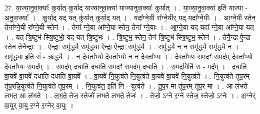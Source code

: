 \documentclass[17pt]{extarticle}
\begin{document}
27. या॒ज्या॒नु॒वा॒क्याः᳚ कुर्यात् कुर्याद् याज्यानुवा॒क्या॑ याज्यानुवा॒क्याः᳚ कुर्यात् । . या॒ज्या॒नु॒वा॒क्या॑ इति॑ याज्या - अ॒नु॒वा॒क्याः᳚ । . कु॒र्या॒द् यद् यत् कु॑र्यात् कुर्या॒द् यत् । . यदा᳚ग्ने॒यी रा᳚ग्ने॒यीर् यद् यदा᳚ग्ने॒यीः । . आ॒ग्ने॒यी स्तेन॒ तेना᳚ग्ने॒यी रा᳚ग्ने॒यी स्तेन॑ । . तेना᳚ ग्ने॒या आ᳚ग्ने॒या स्तेन॒ तेना᳚ ग्ने॒याः । . आ॒ग्ने॒या यद् यदा᳚ ग्ने॒या आ᳚ग्ने॒या यत् । . यत् त्रि॒ष्टुभ॑ स्त्रि॒ष्टुभो॒ यद् यत् त्रि॒ष्टुभः॑ । . त्रि॒ष्टुभ॒ स्तेन॒ तेन॑ त्रि॒ष्टुभ॑ स्त्रि॒ष्टुभ॒ स्तेन॑ । . तेनै॒न्द्रा ऐ॒न्द्रा स्तेन॒ तेनै॒न्द्राः । . ऐ॒न्द्राः समृ॑द्ध्यै॒ समृ॑द्ध्या ऐ॒न्द्रा ऐ॒न्द्राः समृ॑द्ध्यै । . समृ॑द्ध्यै॒ न न समृ॑द्ध्यै॒ समृ॑द्ध्यै॒ न । . समृ॑द्ध्या॒ इति॒ सं - ऋ॒द्ध्यै॒ । . न दे॒वता᳚भ्यो दे॒वता᳚भ्यो॒ न न दे॒वता᳚भ्यः । . दे॒वता᳚भ्यः स॒मदꣳ॑ स॒मद॑म् दे॒वता᳚भ्यो दे॒वता᳚भ्यः स॒मद᳚म् । . स॒मद॑म् दधाति दधाति स॒मदꣳ॑ स॒मद॑म् दधाति । . स॒मद॒मिति॑ स - मद᳚म् । . द॒धा॒ति॒ वा॒यवे॑ वा॒यवे॑ दधाति दधाति वा॒यवे᳚ । . वा॒यवे॑ नि॒युत्व॑ते नि॒युत्व॑ते वा॒यवे॑ वा॒यवे॑ नि॒युत्व॑ते । . नि॒युत्व॑ते तूप॒रम् तू॑प॒रन्नि॒युत्व॑ते नि॒युत्व॑ते तूप॒रम् । . नि॒युत्व॑त॒ इति॑ नि - युत्व॑ते । . तू॒प॒र मा तू॑प॒रम् तू॑प॒र मा । . आ ल॑भते लभत॒ आ ल॑भते । . ल॒भ॒ते॒ तेज॒ स्तेजो॑ लभते लभते॒ तेजः॑ । . तेजो॒ ऽग्ने र॒ग्ने स्तेज॒ स्तेजो॒ ऽग्नेः । . अ॒ग्नेर् वा॒युर् वा॒यु र॒ग्ने र॒ग्नेर् वा॒युः । \newline
\end{document}
